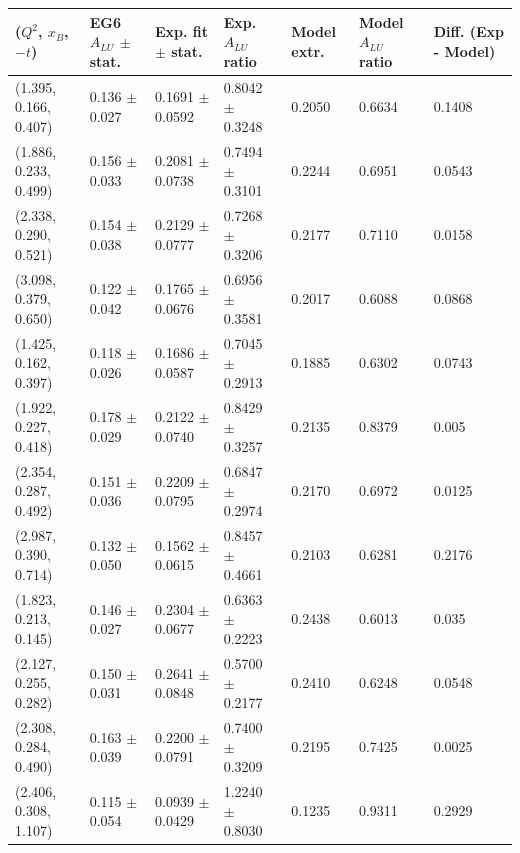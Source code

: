 \small
\begin{landscape}
\begin{table}[!h]
   \begin{center}
      \begin{tabular}{||l|l|l|l|l|l|l||}
         \hline
 ($Q^{2}$, $x_{B}$, $-t$) & EG6 $A_{LU}$ $\pm$ stat. &  Exp. fit $\pm$ stat. & Exp. $A_{LU}$ ratio   &  Model extr. & Model $A_{LU}$ ratio &  Diff. (Exp - Model)    \\
  \hline
(1.395, 0.166, 0.407) &  0.136 $\pm$ 0.027   &    0.1691 $\pm$ 0.0592   &  0.8042 $\pm$ 0.3248  &  0.2050 &  0.6634 &  0.1408 \\
(1.886, 0.233, 0.499) &  0.156 $\pm$ 0.033   &    0.2081 $\pm$ 0.0738   &  0.7494 $\pm$ 0.3101  &  0.2244 &  0.6951 &  0.0543 \\ 
(2.338, 0.290, 0.521) &  0.154 $\pm$ 0.038   &    0.2129 $\pm$ 0.0777   &  0.7268 $\pm$ 0.3206  &  0.2177 &  0.7110 &  0.0158 \\
(3.098, 0.379, 0.650) &  0.122 $\pm$ 0.042   &    0.1765 $\pm$ 0.0676   &  0.6956 $\pm$ 0.3581  &  0.2017 &  0.6088 &  0.0868 \\
  \hline \hline  \hline                                                                                                
(1.425, 0.162, 0.397) &  0.118 $\pm$ 0.026   &    0.1686 $\pm$ 0.0587   &  0.7045 $\pm$ 0.2913  &  0.1885 &  0.6302 &  0.0743 \\
(1.922, 0.227, 0.418) &  0.178 $\pm$ 0.029   &    0.2122 $\pm$ 0.0740   &  0.8429 $\pm$ 0.3257  &  0.2135 &  0.8379 &  0.005  \\
(2.354, 0.287, 0.492) &  0.151 $\pm$ 0.036   &    0.2209 $\pm$ 0.0795   &  0.6847 $\pm$ 0.2974  &  0.2170 &  0.6972 &  0.0125 \\
(2.987, 0.390, 0.714) &  0.132 $\pm$ 0.050   &    0.1562 $\pm$ 0.0615   &  0.8457 $\pm$ 0.4661  &  0.2103 &  0.6281 &  0.2176 \\
  \hline  \hline  \hline                                                                                               
(1.823, 0.213, 0.145) &  0.146 $\pm$ 0.027   &    0.2304 $\pm$ 0.0677   &  0.6363 $\pm$ 0.2223  &  0.2438 &  0.6013 &  0.035  \\
(2.127, 0.255, 0.282) &  0.150 $\pm$ 0.031   &    0.2641 $\pm$ 0.0848   &  0.5700 $\pm$ 0.2177  &  0.2410 &  0.6248 &  0.0548 \\
(2.308, 0.284, 0.490) &  0.163 $\pm$ 0.039   &    0.2200 $\pm$ 0.0791   &  0.7400 $\pm$ 0.3209  &  0.2195 &  0.7425 &  0.0025 \\
(2.406, 0.308, 1.107) &  0.115 $\pm$ 0.054   &    0.0939 $\pm$ 0.0429   &  1.2240 $\pm$ 0.8030  &  0.1235 &  0.9311 &  0.2929 \\

\end{tabular}
\end{center}
\end{table}
\end{landscape}
